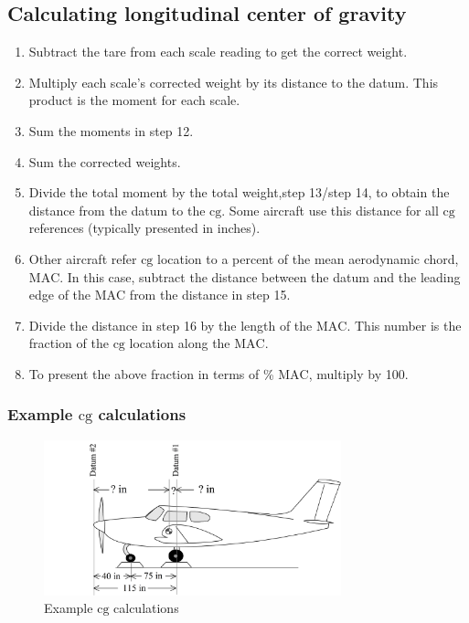 \documentclass[
]{book}
\providecommand{\tightlist}{%
  \setlength{\itemsep}{0pt}\setlength{\parskip}{0pt}}
\begin{document}
\hypertarget{calculating-longitudinal-center-of-gravity}{%
\subsection*{Calculating longitudinal center of gravity}\label{calculating-longitudinal-center-of-gravity}}

\begin{enumerate}
\def\labelenumi{\arabic{enumi}.}
\setcounter{enumi}{10}
\tightlist
\item
  Subtract the tare from each scale reading to get the correct weight.
\item
  Multiply each scale's corrected weight by its distance to the datum. This product is the moment for each scale.
\item
  Sum the moments in step 12.
\item
  Sum the corrected weights.
\item
  Divide the total moment by the total weight,step 13/step 14, to obtain the distance from the datum to the \(\mathrm{cg}\). Some aircraft use this distance for all \(\mathrm{cg}\) references (typically presented in inches).
\item
  Other aircraft refer \(\mathrm{cg}\) location to a percent of the mean aerodynamic chord, \(\mathrm{MAC}\). In this case, subtract the distance between the datum and the leading edge of the \(\mathrm{MAC}\) from the distance in step 15.
\item
  Divide the distance in step 16 by the length of the \(\mathrm{MAC}\). This number is the fraction of the \(\mathrm{cg}\) location along the \(\mathrm{MAC}\).
\item
  To present the above fraction in terms of \% \(\mathrm{MAC}\), multiply by 100.
\end{enumerate}

\hypertarget{example-mathrmcg-calculations}{%
\subsubsection*{\texorpdfstring{Example \(\mathrm{cg}\) calculations}{Example \textbackslash mathrm\{cg\} calculations}}\label{example-mathrmcg-calculations}}

\begin{figure}
\centering
\includegraphics[width=3.38889in,height=1.77083in]{media/07/image1.svg}
\caption{Example \(\mathrm{cg}\) calculations}
\end{figure}
\end{document}
